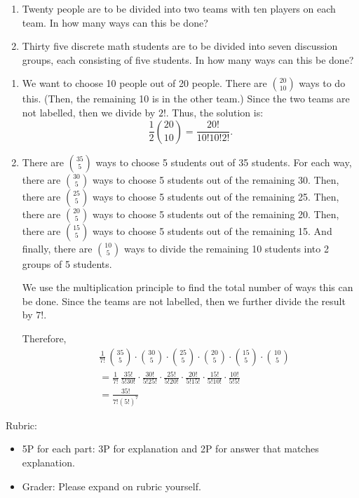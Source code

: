 \documentclass{article}
\theoremstyle{definition}
\begin{document}
\begin{question}
    \begin{enumerate}
        \item Twenty people are to be divided into two teams with ten players on each team.  In how many ways can this be 	
        done?
        \item Thirty five discrete math students are to be divided into seven discussion groups, each consisting of five students.  
        In how many ways can this be done?
    \end{enumerate}
\end{question}
\begin{solution}
    \begin{enumerate}
        \item We want to choose 10 people out of 20 people.  There are $\binom{20}{10}$ ways to do this.  (Then, the remaining 10 is in the other team.) 
        Since the two teams are not labelled, then we divide by $2!$.  Thus, the solution is:
        \[ \frac{1}{2} \binom{20}{10} = \frac{20!}{10!10!2!}. \]
        \item There are $\binom{35}{5}$ ways to choose 5 students out of 35 students.  For each way, there are $\binom{30}{5}$ ways to choose 5 students out of the remaining 30.  Then, there are $\binom{25}{5}$ ways to choose 5 students out of the remaining 25. Then, there are $\binom{20}{5}$ ways to choose 5 students out of the remaining 20. Then, there are $\binom{15}{5}$ ways to choose 5 students out of the remaining 15.  And finally, there are $\binom{10}{5}$ ways to divide the remaining 10 students into 2 groups of 5 students.  

We use the multiplication principle to find the total number of ways this can be done.  Since the teams are not labelled, then we further divide the result by $7!$.

Therefore,
\begin{align*}
    &\frac{1}{7!} \,\binom{35}{5} \cdot \binom{30}{5} \cdot \binom{25}{5 } \cdot \binom{20}{5} \cdot \binom{15}{5 } \cdot \binom{10}{5} \\
    &= 
    \frac{1}{7!} \, \frac{35!}{5!30!} \cdot \frac{30!}{5!25!} \cdot \frac{25!}{5!20!} \cdot \frac{20!}{5!15!} \cdot \frac{15!}{5!10!} \cdot \frac{10!}{5!5!}\\
   & = \frac{35!}{7!(5!)^7}
\end{align*}
    \end{enumerate}
 {\color{red} Rubric:
\begin{itemize}
\item 5P for each part: 3P for explanation and 2P for answer that matches explanation.
\item Grader: Please expand on rubric yourself.
\end{itemize}}
\end{solution}
\end{document}
